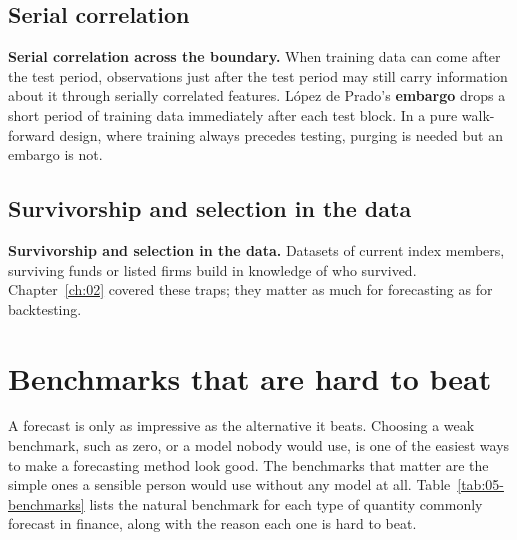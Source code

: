

\subsection{Serial correlation}

\textbf{Serial correlation across the boundary.} When training data can come after the test period, observations just after the test period may still carry information about it through serially correlated features. L\'opez de Prado's \textbf{embargo} drops a short period of training data immediately after each test block. In a pure walk-forward design, where training always precedes testing, purging is needed but an embargo is not.

\subsection{Survivorship and selection in the data} 

\textbf{Survivorship and selection in the data.} 
Datasets of current index members, surviving funds or listed firms build in knowledge of who survived. Chapter~\ref{ch:02} covered these traps; they matter as much for forecasting as for backtesting.

\section{Benchmarks that are hard to beat}
\label{sec:05-benchmarks}

A forecast is only as impressive as the alternative it beats. Choosing a weak benchmark, such as zero, or a model nobody would use, is one of the easiest ways to make a forecasting method look good. The benchmarks that matter are the simple ones a sensible person would use without any model at all. Table~\ref{tab:05-benchmarks} lists the natural benchmark for each type of quantity commonly forecast in finance, along with the reason each one is hard to beat.

